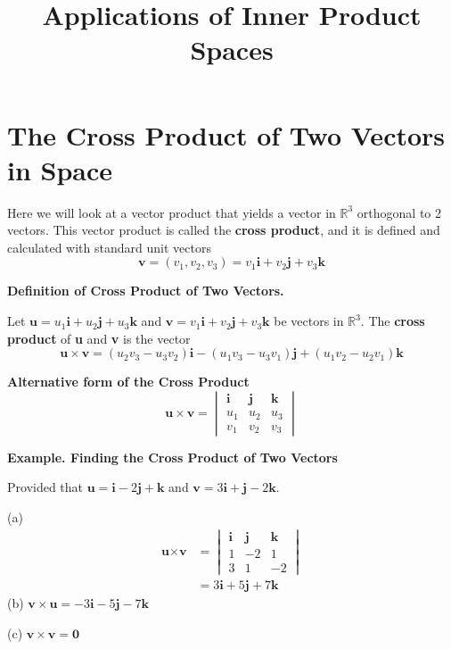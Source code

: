 \documentclass{article}
\title{Applications of Inner Product Spaces}
\date{}
\newcommand\B{\textbf}
\newcommand\x{\times}
\newcommand\R{\mathbb{R}}
\begin{document}
    \section{The Cross Product of Two Vectors in Space}
    Here we will look at a vector product that yields a vector in $\R^3$ orthogonal to 2 vectors. This vector product is
    called the \textbf{cross product}, and it is defined and calculated with standard unit vectors
    \[ \B{v} = (v_1, v_2, v_3) = v_1\B{i} + v_2\B{j} + v_3\B{k} \]
    \begin{tcolorbox}[colback = {blue9}]
        \textbf{Definition of Cross Product of Two Vectors.}

        Let $\B{u} = u_1\B{i} + u_2\B{j} + u_3\B{k}$ and $\B{v} = v_1\B{i} + v_2\B{j} + v_3\B{k}$ be vectors in $\R^3$. The \textbf{cross product}
        of \textbf{u} and \textbf{v} is the vector
        \[\B{u} \times \B{v} = (u_2v_3 - u_3v_2)\B{i} - (u_1v_3 - u_3v_1)\B{j} + (u_1v_2 - u_2v_1)\B{k}\]        

    \textbf{Alternative form of the Cross Product}
    \[ \B{u} \times \B{v} = 
        \begin{vmatrix}
            \B{i} & \B{j} & \B{k} \\
            u_1 & u_2 & u_3 \\
            v_1 & v_2 & v_3
        \end{vmatrix} \]
    \end{tcolorbox}
    \textbf{Example. \textcolor{blue5}{Finding the Cross Product of Two Vectors}}

    Provided that $\B{u} = \B{i} - 2\B{j} + \B{k}$ and $\B{v} = 3\B{i} + \B{j} - 2\B{k}$. 

    (a) \begin{equation*}
        \begin{split}
            \B{u} \x \B{v} & =         \begin{vmatrix}
            \B{i} & \B{j} & \B{k} \\
            1 & -2 & 1 \\
            3 & 1 & -2
        \end{vmatrix}  \\
                           & = 3\B{i} + 5\B{j} + 7\B{k}
        \end{split}
    \end{equation*}
    (b) $\B{v} \times \B{u} = -3\B{i} - 5\B{j} - 7\B{k}$
    
    (c) $\B{v} \times \B{v} = \B{0}$
    
\end{document}
